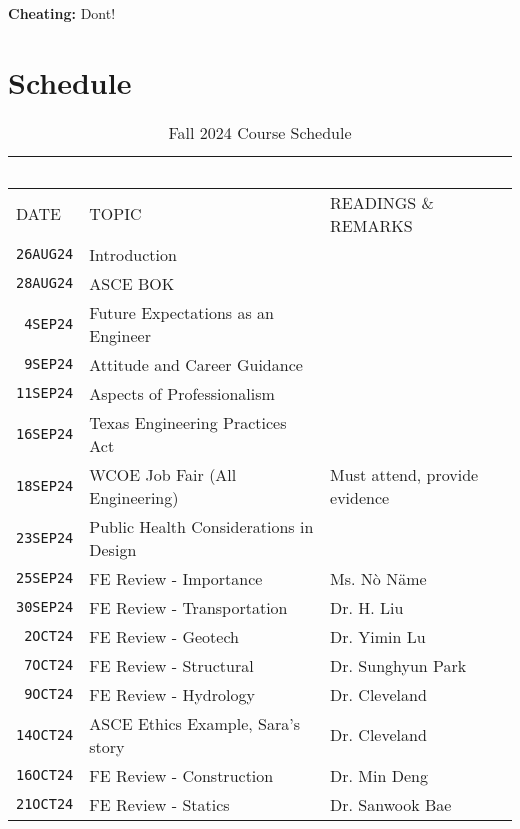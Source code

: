 \documentclass[12pt]{article}
\begin{document}
\textbf{Cheating:} Dont!


\clearpage
\section*{Schedule}
\begin{table}[ht!]
   \centering
   \caption{Fall 2024 Course Schedule}
   \begin{tabular}{p{0.5in}p{2.5in}p{4.0in}} 
   ~ & ~ & ~  \\
\hline
DATE & TOPIC & READINGS \& REMARKS  \\
\hline
\texttt{26AUG24} & Introduction &   \\ %
\texttt{28AUG24} & ASCE BOK &  \cite{ASCE2019}\\ %
\texttt{~4SEP24} & Future Expectations as an Engineer & \\ %
\texttt{~9SEP24} & Attitude and Career Guidance &  \cite{Attitude2024} \\ %
\texttt{11SEP24} & Aspects of Professionalism   &  \cite{Lawson2004}\\ %
\texttt{16SEP24} & Texas Engineering Practices Act & \cite{TEPA2021}\\ %
\texttt{18SEP24} & WCOE Job Fair (All Engineering)   & Must attend, provide evidence\\ %
\texttt{23SEP24} & Public Health Considerations in Design & \cite{TEPAPE2021}\\ %
\texttt{25SEP24} & FE Review - Importance &  Ms. N\`o N\"ame  \\  %
\texttt{30SEP24} & FE Review - Transportation & Dr. H. Liu \cite{NCEES2020}  \cite{Lindeburg2017}\\ %
\texttt{~2OCT24} & FE Review - Geotech & Dr. Yimin Lu \cite{NCEES2020}  \cite{Lindeburg2017}\\ %
\texttt{~7OCT24} & FE Review - Structural & Dr. Sunghyun Park \cite{NCEES2020} \cite{Lindeburg2017}\\ %
\texttt{~9OCT24} & FE Review - Hydrology & Dr. Cleveland \cite{NCEES2020} \cite{Lindeburg2017}\\  %
\texttt{14OCT24} & ASCE Ethics Example, Sara's story  & Dr. Cleveland \cite{ASCE2019}\\ %
\texttt{16OCT24} & FE Review - Construction &  Dr. Min Deng \cite{NCEES2020}  \cite{Lindeburg2017}\\ %
\texttt{21OCT24} & FE Review - Statics  & Dr. Sanwook Bae \cite{NCEES2020}  \cite{Lindeburg2017}\\ %

\end{tabular}
\end{table}
\end{document}
